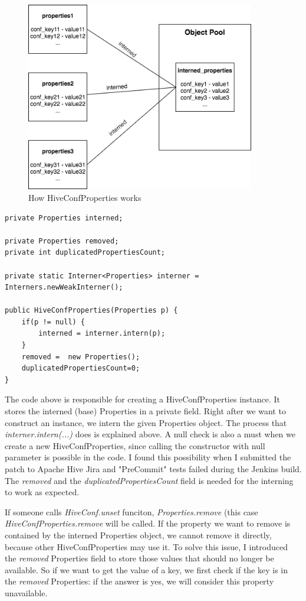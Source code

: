  \begin{figure}[H]
 	\includegraphics[width=100mm,keepaspectratio]{figures/hiveconf_solution.png}
 	\centering
 	\caption{How HiveConfProperties works}
 \end{figure}

\begin{lstlisting}
private Properties interned;

private Properties removed;
private int duplicatedPropertiesCount;

private static Interner<Properties> interner = Interners.newWeakInterner();

public HiveConfProperties(Properties p) {
	if(p != null) {
		interned = interner.intern(p);
	}
	removed =  new Properties();
	duplicatedPropertiesCount=0;
}
\end{lstlisting}

The code above is responsible for creating a HiveConfProperties instance. It stores the interned (base) Properties in a private field. Right after we want to construct an instance, we intern the given Properties object. The process that \textit{interner.intern(...)} does is explained above. A null check is also a must when we create a new HiveConfProperties, since calling the constructor with null parameter is possible in the code. I found this possibility when I submitted the patch to Apache Hive Jira and "PreCommit" tests failed during the Jenkins build. The \textit{removed} and the \textit{duplicatedPropertiesCount} field is needed for the interning to work as expected. 

If someone calls \textit{HiveConf.unset} funciton, \textit{Properties.remove} (this case \textit{HiveConfProperties.remove} will be called. If the property we want to remove is contained by the interned Properties object, we cannot remove it directly, because other HiveConfProperties may use it. To solve this issue, I introduced the \textit{removed} Properties field to store those values that should no longer be available. So if we want to get the value of a key, we first check if the key is in the \textit{removed} Properties: if the answer is yes, we will consider this property unavailable.

